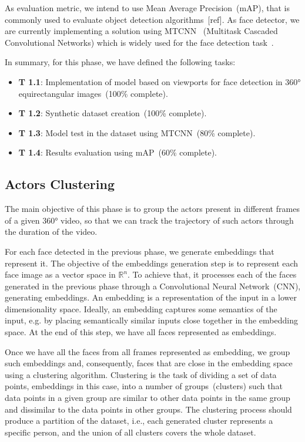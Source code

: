 As evaluation metric, we intend to use Mean Average Precision~(mAP), that is commonly used to evaluate object detection algorithms~[ref]. As face detector, we are currently implementing a solution using MTCNN~\cite{mtcnn} (Multitask Cascaded Convolutional Networks) which is widely used for the face detection task~\cite{mtcnn1, mtcnn2, mtcnn3}. %

In summary, for this phase, we have defined the following tasks:

\begin{itemize}
    \item \textbf{T 1.1}: Implementation of model based on viewports for face detection in 360° equirectangular images~(100\% complete).
    \item \textbf{T 1.2}: Synthetic dataset creation~(100\% complete).
    \item \textbf{T 1.3}: Model test in the dataset using MTCNN~(80\% complete).
    \item \textbf{T 1.4}: Results evaluation using mAP~(60\% complete).
\end{itemize}


\subsection{Actors Clustering}

The main objective of this phase is to group the actors present in different frames of a given 360° video, so that we can track the trajectory of such actors through the duration of the video. 

For each face detected in the previous phase, we generate embeddings that represent it.
The objective of the embeddings generation step is to represent each face image as a vector space in $\mathbb{R}^{n}$.
To achieve that, it processes each of the faces generated in the previous phase through a Convolutional Neural Network~(CNN), generating embeddings. 
An embedding is a representation of the input in a lower dimensionality space.
Ideally, an embedding captures some semantics of the input, e.g. by placing semantically similar inputs close together in the embedding space.
%
At the end of this step, we have all faces represented as embeddings.

Once we have all the faces from all frames represented as embedding, we group such embeddings and, consequently, faces that are close in the embedding space using a clustering algorithm. 
%
Clustering is the task of dividing a set of data points, embeddings in this case, into a number of groups~(clusters) such that data points in a given group are similar to other data points in the same group and dissimilar to the data points in other groups.
The clustering process should produce a partition of the dataset, i.e., each generated cluster represents a specific person, and the union of all clusters covers the whole dataset.

